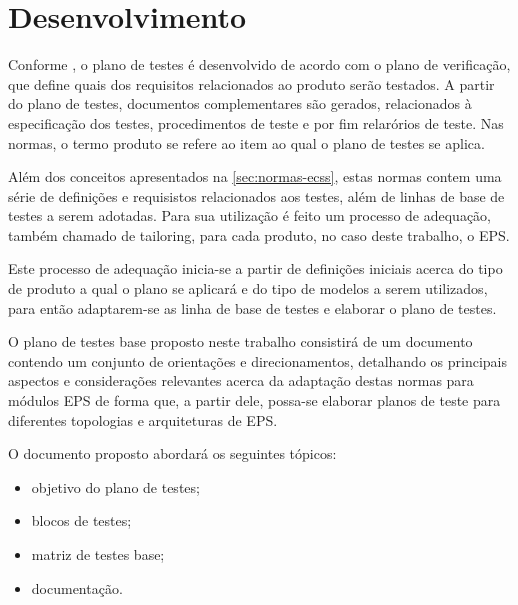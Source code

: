 \chapter{Desenvolvimento}


Conforme \textcite{ecss-e-st-10-03}, o plano de testes é desenvolvido de acordo com o plano de verificação, que define quais dos requisitos relacionados ao produto serão testados.
A partir do plano de testes, documentos complementares são gerados, relacionados à especificação dos testes, procedimentos de teste e por fim relarórios de teste.
Nas normas, o termo produto se refere ao item ao qual o plano de testes se aplica.

Além dos conceitos apresentados na \autoref{sec:normas-ecss}, estas normas contem uma série de definições e requisistos relacionados aos testes, além de linhas de base de testes a serem adotadas.
Para sua utilização é feito um processo de adequação, também chamado de tailoring, para cada produto, no caso deste trabalho, o \gls{EPS}.

Este processo de adequação inicia-se a partir de definições iniciais acerca do tipo de produto a qual o plano se aplicará e do tipo de modelos a serem utilizados, para então adaptarem-se as linha de base de testes e elaborar o plano de testes.


O plano de testes base proposto neste trabalho consistirá de um documento contendo um conjunto de orientações e direcionamentos, detalhando os principais aspectos e considerações relevantes acerca da adaptação destas normas para módulos \gls{EPS} de forma que, a partir dele, possa-se elaborar planos de teste para diferentes topologias e arquiteturas de \gls{EPS}.

O documento proposto abordará os seguintes tópicos:
\begin{itemize}
    \item objetivo do plano de testes;
    \item blocos de testes;
    \item matriz de testes base;
    \item documentação.
\end{itemize}







